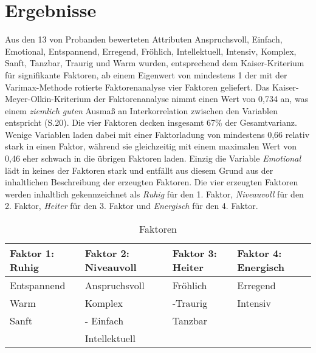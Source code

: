 \section*{Ergebnisse}
\label{sec:Ergebnisse}
Aus den 13 von Probanden bewerteten Attributen Anspruchsvoll, Einfach, Emotional, Entspannend, Erregend, Fröhlich, Intellektuell, Intensiv, Komplex, Sanft, Tanzbar, Traurig und Warm wurden, entsprechend dem Kaiser-Kriterium für signifikante Faktoren, ab einem Eigenwert von mindestens 1 der mit der Varimax-Methode rotierte Faktorenanalyse vier Faktoren geliefert.
Das Kaiser-Meyer-Olkin-Kriterium der Faktorenanalyse nimmt einen Wert von 0,734 an, was einem \textit{ziemlich guten} Ausmaß an Interkorrelation zwischen den Variablen entspricht \cite{eckey2002multivariate} (S.20).
Die vier Faktoren decken insgesamt 67\% der Gesamtvarianz.
Wenige Variablen laden dabei mit einer Faktorladung von mindestens 0,66 relativ stark in einen Faktor, während sie gleichzeitig mit einem maximalen Wert von 0,46 eher schwach in die übrigen Faktoren laden.
Einzig die Variable \textit{Emotional} lädt in keines der Faktoren stark und entfällt aus diesem Grund aus der inhaltlichen Beschreibung der erzeugten Faktoren.
Die vier erzeugten Faktoren werden inhaltlich gekennzeichnet als \textit{Ruhig} für den 1. Faktor, \textit{Niveauvoll} für den 2.
Faktor, \textit{Heiter} für den 3. Faktor und \textit{Energisch} für den 4. Faktor.

\begin{table}[htbp]
    \centering
    \caption{Faktoren}
    \vspace{2mm}
    \label{tab:faktoren}
        \begin{tabularx}{8cm}{|X|X|X|X|}
            \hline Faktor 1: Ruhig & Faktor 2: Niveauvoll & Faktor 3: Heiter & Faktor 4: Energisch \\
            \hline Entspan\-nend & Anspruchs\-voll       & Fröhlich             & Erregend \\
            \hline Warm              & Komplex                  & -Traurig             & Intensiv \\
            \hline Sanft               & - Einfach                 & Tanzbar             & \\
            \hline                        & Intellek\-tuell          &                          & \\
            \hline
        \end{tabularx}
\end{table}


